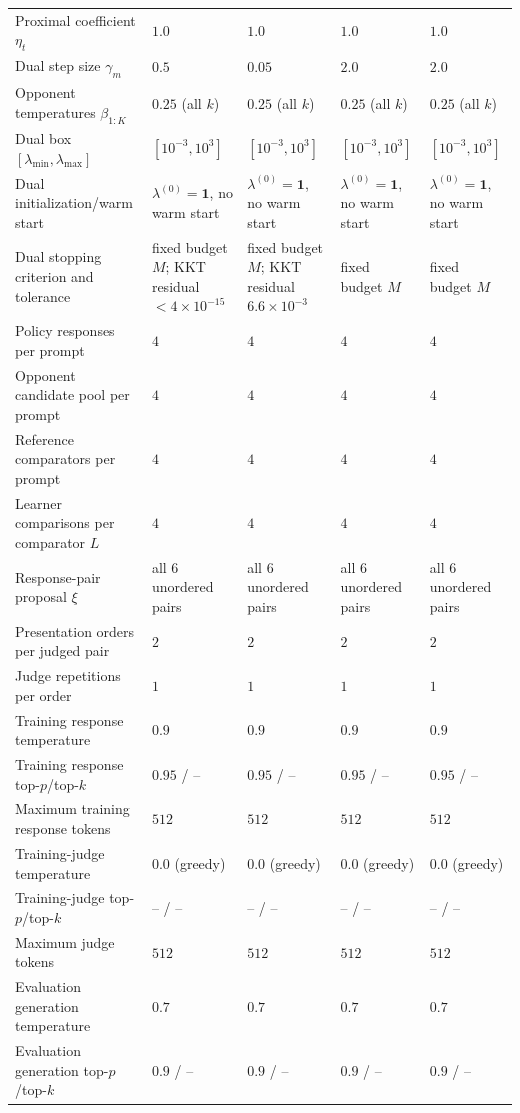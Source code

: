 \documentclass{article}
\theoremstyle{remark}
\theoremstyle{plain}
\begin{document}
\begin{table}[t]
\begin{tabular}{@{}p{}p{}p{}p{}p{}@{}}
Proximal coefficient $\eta_t$ & $1.0$ & $1.0$ & $1.0$ & $1.0$ \\
Dual step size $\gamma_m$ & $0.5$ & $0.05$ & $2.0$ & $2.0$ \\
Opponent temperatures $\beta_{1:K}$ & $0.25$ (all $k$) & $0.25$ (all $k$) & $0.25$ (all $k$) & $0.25$ (all $k$) \\
Dual box $[\lambda_{\min},\lambda_{\max}]$ & $[10^{-3},10^{3}]$ & $[10^{-3},10^{3}]$ & $[10^{-3},10^{3}]$ & $[10^{-3},10^{3}]$ \\
Dual initialization/warm start & $\lambda^{(0)}=\mathbf 1$, no warm start & $\lambda^{(0)}=\mathbf 1$, no warm start & $\lambda^{(0)}=\mathbf 1$, no warm start & $\lambda^{(0)}=\mathbf 1$, no warm start \\
Dual stopping criterion and tolerance & fixed budget $M$; KKT residual $<4\times10^{-15}$ & fixed budget $M$; KKT residual $6.6\times10^{-3}$ & fixed budget $M$ & fixed budget $M$ \\
Policy responses per prompt & $4$ & $4$ & $4$ & $4$ \\
Opponent candidate pool per prompt & $4$ & $4$ & $4$ & $4$ \\
Reference comparators per prompt & $4$ & $4$ & $4$ & $4$ \\
Learner comparisons per comparator $L$ & $4$ & $4$ & $4$ & $4$ \\
Response-pair proposal $\xi$ & all $6$ unordered pairs & all $6$ unordered pairs & all $6$ unordered pairs & all $6$ unordered pairs \\
Presentation orders per judged pair & $2$ & $2$ & $2$ & $2$ \\
Judge repetitions per order & $1$ & $1$ & $1$ & $1$ \\
Training response temperature & $0.9$ & $0.9$ & $0.9$ & $0.9$ \\
Training response top-$p$/top-$k$ & $0.95$ / -- & $0.95$ / -- & $0.95$ / -- & $0.95$ / -- \\
Maximum training response tokens & $512$ & $512$ & $512$ & $512$ \\
Training-judge temperature & $0.0$ (greedy) & $0.0$ (greedy) & $0.0$ (greedy) & $0.0$ (greedy) \\
Training-judge top-$p$/top-$k$ & -- / -- & -- / -- & -- / -- & -- / -- \\
Maximum judge tokens & $512$ & $512$ & $512$ & $512$ \\
Evaluation generation temperature & $0.7$ & $0.7$ & $0.7$ & $0.7$ \\
Evaluation generation top-$p$/top-$k$ & $0.9$ / -- & $0.9$ / -- & $0.9$ / -- & $0.9$ / -- \\

\end{tabular}
\end{table}
\end{document}
